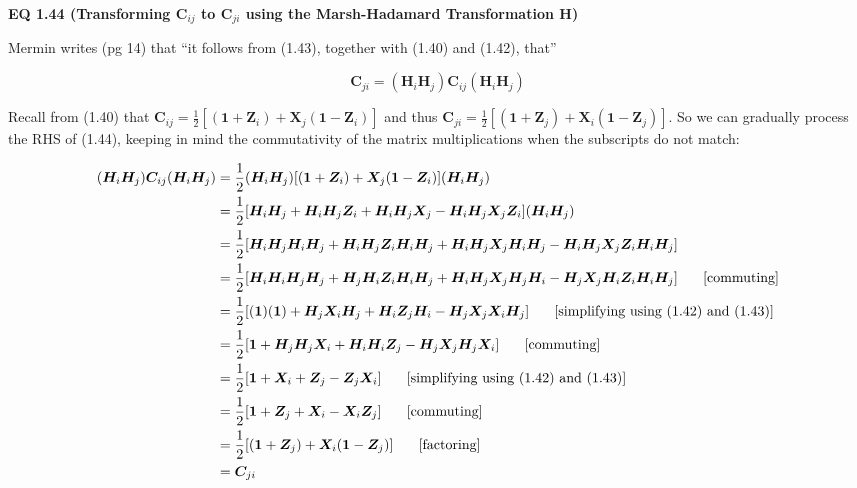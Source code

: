 \documentclass{article}
\begin{document}
\vspace{0.125in}


\vspace{0.25in}

\textbf{EQ 1.44 (Transforming $\bm{C}_{ij}$ to $\bm{C}_{ji}$ using the Marsh-Hadamard Transformation $\bm{H}$)}\par

\vspace{0.25in}

Mermin writes (pg 14) that ``it follows from (1.43), together with (1.40) and (1.42), that''

\[\tag{1.44}
\bm{C}_{ji} = (\bm{H}_i\bm{H}_j)\bm{C}_{ij}(\bm{H}_i\bm{H}_j)
\]

Recall from (1.40) that $\bm{C}_{ij} = \frac{1}{2}[(\bm{1} + \bm{Z}_i) + \bm{X}_j(\bm{1} - \bm{Z}_i)]$ and thus $\bm{C}_{ji} = \frac{1}{2}[(\bm{1} + \bm{Z}_j) + \bm{X}_i(\bm{1} - \bm{Z}_j)]$. So we can gradually process the RHS of (1.44), keeping in mind the commutativity of the matrix multiplications when the subscripts do not match:

\begin{align*}
(\bm{H}_i\bm{H}_j)\bm{C}_{ij}(\bm{H}_i\bm{H}_j)
&= \frac{1}{2}(\bm{H}_i\bm{H}_j)[(\bm{1} + \bm{Z}_i) + \bm{X}_j(\bm{1} - \bm{Z}_i)](\bm{H}_i\bm{H}_j)\\
&= \frac{1}{2}[\bm{H}_i\bm{H}_j + \bm{H}_i\bm{H}_j\bm{Z}_i + \bm{H}_i\bm{H}_j\bm{X}_j - \bm{H}_i\bm{H}_j\bm{X}_j\bm{Z}_i](\bm{H}_i\bm{H}_j)\\
&= \frac{1}{2}[\bm{H}_i\bm{H}_j\bm{H}_i\bm{H}_j + \bm{H}_i\bm{H}_j\bm{Z}_i\bm{H}_i\bm{H}_j + \bm{H}_i\bm{H}_j\bm{X}_j\bm{H}_i\bm{H}_j - \bm{H}_i\bm{H}_j\bm{X}_j\bm{Z}_i\bm{H}_i\bm{H}_j]\\
&= \frac{1}{2}[\bm{H}_i\bm{H}_i\bm{H}_j\bm{H}_j
+ \bm{H}_j\bm{H}_i\bm{Z}_i\bm{H}_i\bm{H}_j
+ \bm{H}_i\bm{H}_j\bm{X}_j\bm{H}_j\bm{H}_i
- \bm{H}_j\bm{X}_j\bm{H}_i\bm{Z}_i\bm{H}_i\bm{H}_j] \text{\hspace{.25in}[commuting]}\\
&= \frac{1}{2}[(\bm{1})(\bm{1})
+ \bm{H}_j\bm{X}_i\bm{H}_j
+ \bm{H}_i\bm{Z}_j\bm{H}_i
- \bm{H}_j\bm{X}_j\bm{X}_i\bm{H}_j] \text{\hspace{.25in}[simplifying using (1.42) and (1.43)]}\\
&= \frac{1}{2}[\bm{1}
+ \bm{H}_j\bm{H}_j\bm{X}_i
+ \bm{H}_i\bm{H}_i\bm{Z}_j
- \bm{H}_j\bm{X}_j\bm{H}_j\bm{X}_i] \text{\hspace{.25in}[commuting]}\\
&= \frac{1}{2}[\bm{1}
+ \bm{X}_i
+ \bm{Z}_j
- \bm{Z}_j\bm{X}_i] \text{\hspace{.25in}[simplifying using (1.42) and (1.43)]}\\
&= \frac{1}{2}[\bm{1}
+ \bm{Z}_j
+ \bm{X}_i
- \bm{X}_i\bm{Z}_j] \text{\hspace{.25in}[commuting]}\\
&= \frac{1}{2}[(\bm{1} + \bm{Z}_j)
+ \bm{X}_i (\bm{1} - \bm{Z}_j)] \text{\hspace{.25in}[factoring]}\\
&= \bm{C}_{ji}
\end{align*}



\printbibliography
\end{document}

